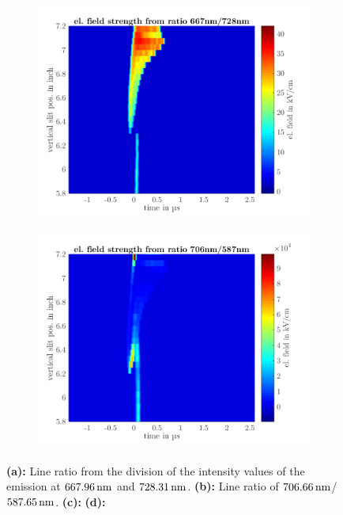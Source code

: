 \documentclass[a4paper,10pt]{article}
\newcommand{\fett}[1]{\textbf{#1}}
\begin{document}
\begin{figure}
					\begin{subfigure}[t]{0.48\textwidth}
						\includegraphics[width=\textwidth]{figures/results/lineratios/square/elfield667}
						\vspace{-0.5cm}\caption{}
						\label{img:elfield667}
					\end{subfigure}
					\hfill
					\begin{subfigure}[t]{0.48\textwidth}
						\includegraphics[width=\textwidth]{figures/results/lineratios/square/elfield706}
						\vspace{-0.5cm}\caption{}
						\label{img:elfield7065}
					\end{subfigure}
					
					\caption{\fett{(a):} Line ratio from the division of the intensity values of the emission at $\unit[667.96]{nm}$ and $\unit[728.31]{nm}$. \fett{(b):} Line ratio of $\unit[706.66]{nm}$/$\unit[587.65]{nm}$. \fett{(c):} \fett{(d):} }
				\end{figure}
				
\end{document}
